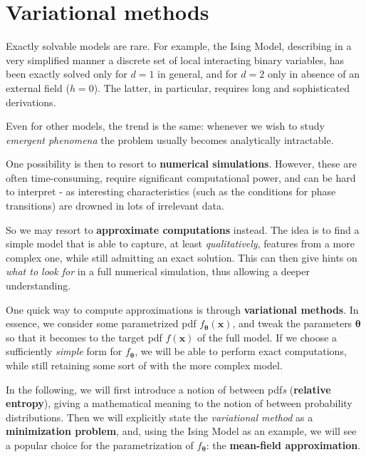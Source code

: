 \documentclass[../template.tex]{subfiles}
\begin{document}
\chapter{Variational methods}
Exactly solvable models are rare. For example, the Ising Model, describing in a very simplified manner a discrete set of local interacting binary variables, has been exactly solved only for $d=1$ in general, and for $d=2$ only in absence of an external field ($h=0$). The latter, in particular, requires long and sophisticated derivations.

Even for other models, the trend is the same: whenever we wish to study \textit{emergent phenomena} the problem usually becomes analytically intractable.

\medskip

One possibility is then to resort to \textbf{numerical simulations}. However, these are often time-consuming, require significant computational power, and can be hard to interpret - as interesting  characteristics (such as the conditions for phase transitions) are drowned in lots of irrelevant  data. 

\medskip

So we may resort to \textbf{approximate computations} instead. The idea is to find a simple model that is able to capture, at least \textit{qualitatively}, features from a more complex one, while still admitting an exact solution. This can then give hints on \textit{what to look for} in a full numerical simulation, thus allowing a deeper understanding. 

\medskip

One quick way to compute approximations is through \textbf{variational methods}. In essence, we consider some parametrized pdf $f_{\bm{\theta}}(\bm{x})$, and tweak the parameters $\bm{\bm{\theta}}$ so that it becomes  to the target pdf $f(\bm{x})$ of the full model. If we choose a sufficiently \textit{simple} form for $f_{\bm{\theta}}$, we will be able to perform exact computations, while still retaining some sort of  with the more complex model.

\medskip

In the following, we will first introduce a notion of  between pdf\textit{s} (\textbf{relative entropy}), giving a mathematical meaning to the notion of  between probability distributions. Then we will explicitly state the \textit{variational method} as a \textbf{minimization problem}, and, using the Ising Model as an example, we will see a popular choice for the parametrization of $f_{\bm{\theta}}$: the \textbf{mean-field approximation}.  
\end{document}

